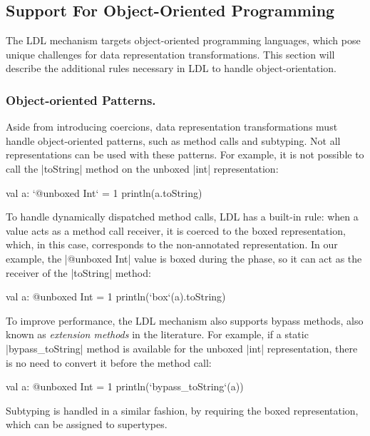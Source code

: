 \subsection{Support For Object-Oriented Programming}
\label{sec:ldl:oo-patterns}

The LDL mechanism targets object-oriented programming languages, which pose unique challenges for data representation transformations. This section will describe the additional rules necessary in LDL to handle object-orientation.

\subsubsection{Object-oriented Patterns.} Aside from introducing coercions, data representation transformations must handle object-oriented patterns, such as method calls and subtyping. Not all representations can be used with these patterns. For example, it is not possible to call the |toString| method on the unboxed |int| representation:

\begin{lstlisting-nobreak}
val a: `@unboxed Int` = 1
println(a.toString)
\end{lstlisting-nobreak}

To handle dynamically dispatched method calls, LDL has a built-in rule: when a value acts as a method call receiver, it is coerced to the boxed representation, which, in this case, corresponds to the non-annotated representation. In our example, the |@unboxed Int| value is boxed during the \coerce{} phase, so it can act as the receiver of the |toString| method:

\begin{lstlisting-nobreak}
val a: @unboxed Int = 1
println(`box`(a).toString)
\end{lstlisting-nobreak}

To improve performance, the LDL mechanism also supports bypass methods, also known as
\emph{extension methods} in the literature. For example, if a static |bypass_toString| method is available for the unboxed |int| representation, there is no need to convert it before the method call:

\begin{lstlisting-nobreak}
val a: @unboxed Int = 1
println(`bypass_toString`(a))
\end{lstlisting-nobreak}

Subtyping is handled in a similar fashion, by requiring the boxed representation, which can be assigned to supertypes.

